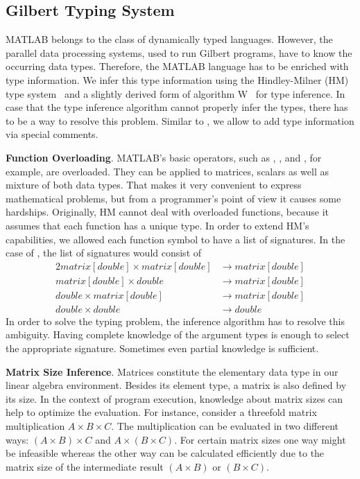 \subsection{Gilbert Typing System}
\label{sec:gilberttyping}

MATLAB belongs to the class of dynamically typed languages.
However, the parallel data processing systems, used to run Gilbert programs, have to know the occurring data types.
Therefore, the MATLAB language has to be enriched with type information. 
We infer this type information using the Hindley-Milner (HM) type system~\cite{hindley:tams1969a,milner:jcss1978a} and a slightly derived form of algorithm W~\cite{damas:1982a} for type inference. 
In case that the type inference algorithm cannot properly infer the types, there has to be a way to resolve this problem. 
Similar to \cite{furr:2009a}, we allow to add type information via special comments.

\textbf{Function Overloading}. MATLAB's basic operators, such as \code{+}, \code{-}, \code{/} and \code{*}, for example, are overloaded.
They can be applied to matrices, scalars as well as mixture of both data types.
That makes it very convenient to express mathematical problems, but from a programmer's point of view it causes some hardships.
Originally, HM cannot deal with overloaded functions, because it assumes that each function has a unique type.
In order to extend HM's capabilities, we allowed each function symbol to have a list of signatures.
In the case of \code{+}, the list of signatures would consist of 
\begin{alignat*}{2}
matrix[double] \times matrix[double] &\rightarrow matrix[double]\\
matrix[double] \times double &\rightarrow matrix[double]\\
double \times matrix[double] &\rightarrow matrix[double]\\
double \times double &\rightarrow double
\end{alignat*}
In order to solve the typing problem, the inference algorithm has to resolve this ambiguity.
Having complete knowledge of the argument types is enough to select the appropriate signature.
Sometimes even partial knowledge is sufficient.

\textbf{Matrix Size Inference}. Matrices constitute the elementary data type in our linear algebra environment.
Besides its element type, a matrix is also defined by its size.
In the context of program execution, knowledge about matrix sizes can help to optimize the evaluation.
For instance, consider a threefold matrix multiplication $A\times B\times C$.
The multiplication can be evaluated in two different ways: $(A\times B)\times C$ and $A\times(B\times C)$.
For certain matrix sizes one way might be infeasible whereas the other way can be calculated efficiently due to the matrix size of the intermediate result $(A\times B)$ or $(B\times C)$.

